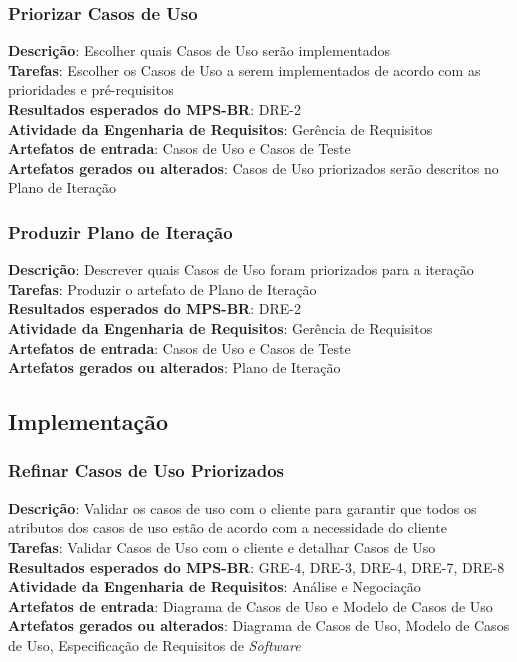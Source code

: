 \subsubsection{Priorizar Casos de Uso}

\textbf{Descrição}: Escolher quais Casos de Uso serão implementados\\
\textbf{Tarefas}: Escolher os Casos de Uso a serem implementados de acordo com as prioridades e pré-requisitos\\
\textbf{Resultados esperados do MPS-BR}: DRE-2\\
\textbf{Atividade da Engenharia de Requisitos}: Gerência de Requisitos\\
\textbf{Artefatos de entrada}: Casos de Uso e Casos de Teste\\
\textbf{Artefatos gerados ou alterados}: Casos de Uso priorizados serão descritos no Plano de Iteração

\subsubsection{Produzir Plano de Iteração}

\textbf{Descrição}: Descrever quais Casos de Uso foram priorizados para a iteração\\
\textbf{Tarefas}: Produzir o artefato de Plano de Iteração\\
\textbf{Resultados esperados do MPS-BR}: DRE-2\\
\textbf{Atividade da Engenharia de Requisitos}: Gerência de Requisitos\\
\textbf{Artefatos de entrada}: Casos de Uso e Casos de Teste\\
\textbf{Artefatos gerados ou alterados}: Plano de Iteração

\subsection{Implementação}

\subsubsection{Refinar Casos de Uso Priorizados}

\textbf{Descrição}: Validar os casos de uso com o cliente para garantir que todos os atributos dos casos de uso estão de acordo com a necessidade do cliente\\
\textbf{Tarefas}: Validar Casos de Uso com o cliente e detalhar Casos de Uso\\
\textbf{Resultados esperados do MPS-BR}: GRE-4, DRE-3, DRE-4, DRE-7, DRE-8\\
\textbf{Atividade da Engenharia de Requisitos}: Análise e Negociação\\
\textbf{Artefatos de entrada}: Diagrama de Casos de Uso e Modelo de Casos de Uso\\
\textbf{Artefatos gerados ou alterados}: Diagrama de Casos de Uso, Modelo de Casos de Uso, Especificação de Requisitos de \textit{Software}

